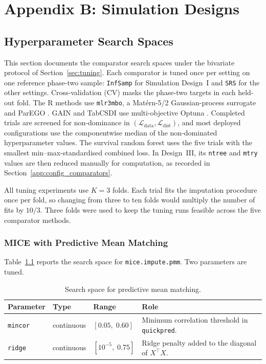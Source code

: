 \chapter{Appendix B: Simulation Designs}
\section{Hyperparameter Search Spaces}
\label{app:hyperparam}

This section documents the comparator search spaces under the bivariate protocol of Section~\ref{sec:tuning}. Each comparator is tuned once per setting on one reference phase-two sample: \texttt{InfSamp} for Simulation Design~I and \texttt{SRS} for the other settings. Cross-validation (CV) masks the phase-two targets in each held-out fold. The R methods use \texttt{mlr3mbo}, a Mat\'{e}rn-5/2 Gaussian-process surrogate and ParEGO \citep{bischl2024hyperparameter,knowles2006parego}. GAIN and TabCSDI use multi-objective Optuna \citep{Akiba2019}. Completed trials are screened for non-dominance in $(\mathcal L_{\mathrm{data}},\mathcal L_{\mathrm{dist}})$, and most deployed configurations use the componentwise median of the non-dominated hyperparameter values. The survival random forest uses the five trials with the smallest min--max-standardised combined loss. In Design~III, its \texttt{ntree} and \texttt{mtry} values are then reduced manually for computation, as recorded in Section~\ref{app:config_comparators}.

All tuning experiments use $K=3$ folds. Each trial fits the imputation procedure once per fold, so changing from three to ten folds would multiply the number of fits by $10/3$. Three folds were used to keep the tuning runs feasible across the five comparator methods.

\subsection{MICE with Predictive Mean Matching}

Table~\ref{tab:tune_mice_pmm} reports the search space for \texttt{mice.impute.pmm}. Two parameters are tuned.

\begin{table}[ht]
\centering
\caption{Search space for predictive mean matching.}
\label{tab:tune_mice_pmm}
\begin{tabularx}{\textwidth}{lll>{\raggedright\arraybackslash}X}
\toprule
Parameter & Type & Range & Role \\
\midrule
\texttt{mincor} & continuous & $[0.05,\; 0.60]$ &
    Minimum correlation threshold in \texttt{quickpred}. \\
\texttt{ridge} & continuous & $[10^{-5},\; 0.75]$ &
    Ridge penalty added to the diagonal of $X^{\top}X$. \\
\bottomrule
\end{tabularx}
\end{table}

